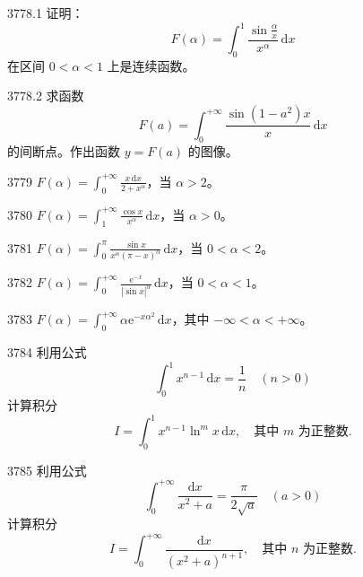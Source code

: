 \begin{prob}[M]{3778.1}
证明：
\[
F(\alpha) = \int_{0}^{1} \frac{\sin \frac{\alpha}{x}}{x^\alpha}\,\mathrm{d}x
\]
在区间 $0 < \alpha < 1$ 上是连续函数。
\end{prob}

\begin{prob}[M]{3778.2}
求函数
\[
F(a) = \int_{0}^{+\infty} \frac{\sin(1-a^2)x}{x}\,\mathrm{d}x
\]
的间断点。作出函数 $y = F(a)$ 的图像。
\end{prob}


\begin{prob}[S]{3779}
$F(\alpha) = \int_{0}^{+\infty} \frac{x\,\mathrm{d}x}{2 + x^\alpha}$，当 $\alpha > 2$。
\end{prob}

\begin{prob}[S]{3780}
$F(\alpha) = \int_{1}^{+\infty} \frac{\cos x}{x^\alpha}\,\mathrm{d}x$，当 $\alpha > 0$。
\end{prob}

\begin{prob}[S]{3781}
$F(\alpha) = \int_{0}^{\pi} \frac{\sin x}{x^\alpha (\pi - x)^\alpha}\,\mathrm{d}x$，当 $0 < \alpha < 2$。
\end{prob}

\begin{prob}[S]{3782}
$F(\alpha) = \int_{0}^{+\infty} \frac{\mathrm{e}^{-x}}{|\sin x|^\alpha}\,\mathrm{d}x$，当 $0 < \alpha < 1$。
\end{prob}

\begin{prob}[S]{3783}
$F(\alpha) = \int_{0}^{+\infty} \alpha \mathrm{e}^{-x\alpha^2}\,\mathrm{d}x$，其中 $-\infty < \alpha < +\infty$。
\end{prob}


\begin{prob}[M]{3784}
利用公式
\[
\int_{0}^{1} x^{n-1}\,\mathrm{d}x = \frac{1}{n} \quad (n > 0)
\]
计算积分
\[
I = \int_{0}^{1} x^{n-1} \ln^m x\,\mathrm{d}x, \quad \text{其中 } m \text{ 为正整数}.
\]
\end{prob}

\begin{prob}[M]{3785}
利用公式
\[
\int_{0}^{+\infty} \frac{\mathrm{d}x}{x^2 + a} = \frac{\pi}{2\sqrt{a}} \quad (a > 0)
\]
计算积分
\[
I = \int_{0}^{+\infty} \frac{\mathrm{d}x}{(x^2 + a)^{n+1}}, \quad \text{其中 } n \text{ 为正整数}.
\]
\end{prob}

